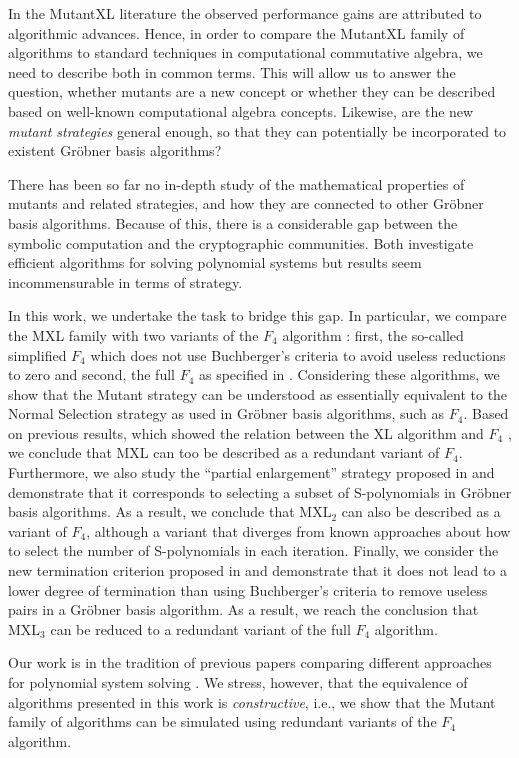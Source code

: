 In the MutantXL literature \cite{mxl,mxl2,mxl3,mxl4} the observed performance gains are attributed to algorithmic advances. Hence, in order to compare the MutantXL family of algorithms to standard techniques in computational commutative algebra, we need to describe both in common terms. This will allow us to answer the question, whether  mutants are a new concept or whether they can be described based on well-known computational algebra concepts. Likewise, are the new {\it mutant strategies} general enough, so that they can potentially be incorporated to existent Gr\"obner basis algorithms?

There has been so far no in-depth study of the mathematical properties of mutants and related strategies, and how they are connected to other Gr\"obner basis algorithms. Because of this, there is a considerable gap between the symbolic computation and the cryptographic communities. Both investigate efficient algorithms for solving polynomial systems but results seem incommensurable in terms of strategy.

In this work, we undertake the task to bridge this gap. In particular, we compare the MXL family with two variants of the $F_4$ algorithm \cite{F4}: first, the so-called simplified $F_4$ which does not use Buchberger's criteria to avoid useless reductions to zero and second, the full $F_4$ as specified in \cite{F4}. Considering these algorithms, we show that the Mutant strategy can be understood as essentially equivalent to the Normal Selection strategy as used in Gr\"obner basis algorithms, such as $F_4$. Based on previous results, which showed the relation between the XL algorithm and $F_4$ \cite{DBLP:conf/asiacrypt/ArsFIKS04}, we conclude that MXL can too be described as a redundant variant of $F_4$. Furthermore, we also study the ``partial enlargement'' strategy proposed in \cite{mxl2} and demonstrate that it corresponds to selecting a subset of S-polynomials in Gr\"obner basis algorithms. As a result, we conclude that MXL$_2$ can also be described as a variant of $F_4$, although a variant that diverges from known approaches about how to select the number of S-polynomials in each iteration.  Finally, we consider the new termination criterion proposed in \cite{mxl3} and demonstrate that it does not lead to a lower degree of termination than using Buchberger's criteria to remove useless pairs in a Gröbner basis algorithm. As a result, we reach the conclusion that MXL$_3$ can  be reduced to a redundant variant of the full $F_4$ algorithm.

Our work is in the tradition of previous papers comparing different approaches for polynomial system solving \cite{Mandache-phd,
Mandache-tc,Mandache1994}. We stress, however, that the equivalence of algorithms presented in this work is {\em constructive}, i.e., we show that the Mutant family of algorithms can be simulated using redundant variants of the $F_4$ algorithm.

